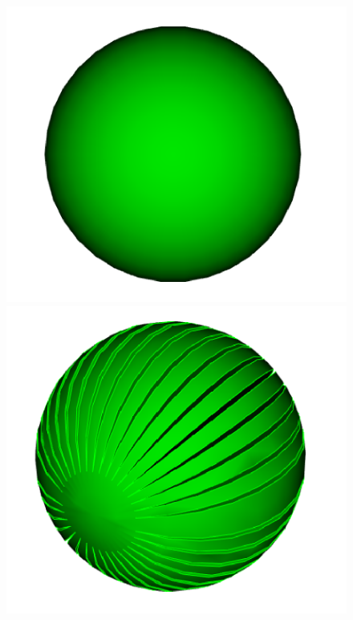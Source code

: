 \documentclass[12pt, a4paper]{article}
\begin{document}
\begin{figure}

  \begin{center}
    
    \includegraphics[scale=0.1]{sphere.png}
    \includegraphics[scale=0.1]{ds.png}

\end{center}
\end{figure}
\end{document}

